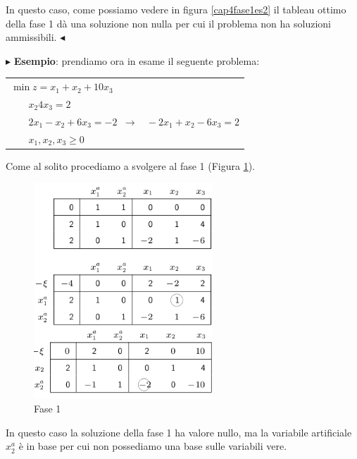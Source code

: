 \documentclass[11pt]{book}
\begin{document}
In questo caso, come possiamo vedere in figura \ref{cap4fase1es2} il
tableau ottimo della fase 1 d\`a una soluzione non nulla per cui il
problema non ha soluzioni ammissibili. $\blacktriangleleft$
\vspace{11pt}

\vspace{11pt}
$\blacktriangleright$ {\bf Esempio}: prendiamo ora in esame il
seguente problema:

\vspace{11pt}
\begin{center}
  \begin{tabular}{l}
    $\min z = x_1 + x_2 + 10x_3$\\
    $\phantom{min}x_2  4x_3 =2$\\
    $\phantom{min}2x_1 - x_2 + 6x_3 = -2\phantom{a}\rightarrow\phantom{m} -2x_1 + x_2 -
    6x_3 = 2$\\
    $\phantom{min}x_1, x_2, x_3 \geq 0$\\
  \end{tabular}
\end{center}
\vspace{11pt}

Come al solito procediamo a svolgere al fase 1 (Figura
\ref{cap4fase1es3}).

\begin{figure}[h!]
  \centering
  \includegraphics[width=0.6\textwidth]{images/cap4fase1es3.png}
  \caption{Fase 1}
  \label{cap4fase1es3}
\end{figure}

In questo caso la soluzione della fase 1 ha valore nullo, ma la
variabile artificiale $x_2^a$ \`e in base per cui non possediamo una
base sulle variabili vere. 
\end{document}
